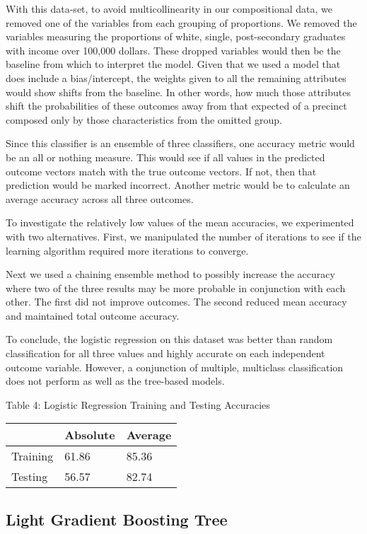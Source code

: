\documentclass{article}
\begin{document}
\begin{itemize}
With this data-set, to avoid multicollinearity in our compositional data, we removed one of the variables from each grouping of proportions. We removed the variables measuring the proportions of white, single, post-secondary graduates with income over 100,000 dollars. These dropped variables would then be the baseline from which to interpret the model. Given that we used a model that does include a bias/intercept, the weights given to all the remaining attributes would show shifts from the baseline. In other words, how much those attributes shift the probabilities of these outcomes away from that expected of a precinct composed only by those characteristics from the omitted group.

Since this classifier is an ensemble of three classifiers, one accuracy metric would be an all or nothing measure. This would see if all values in the predicted outcome vectors match with the true outcome vectors. If not, then that prediction would be marked incorrect. Another metric would be to calculate an average accuracy across all three outcomes.

To investigate the relatively low values of the mean accuracies, 
we experimented with two alternatives. 
First, we manipulated the number of iterations to see if the learning algorithm required more iterations to converge.


Next we used a chaining ensemble method to possibly increase the accuracy where two of the three results may be more probable in conjunction with each other. The first did not improve outcomes. The second reduced mean accuracy and maintained total outcome accuracy.


To conclude, the logistic regression on this dataset was better than random classification for all three values and highly accurate on each independent outcome variable. However, a conjunction of multiple, multiclass classification does not perform as well as the tree-based models.

Table 4: Logistic Regression Training and Testing Accuracies
\begin{table}[h]
\begin{tabular}{l|ll}
\hline 
        & Absolute & Average \\
\hline
Training & 61.86    & 85.36   \\
Testing  & 56.57    & 82.74  
\end{tabular}
\end{table}

\subsection{Light Gradient Boosting Tree}


\end{itemize}
\end{document}
